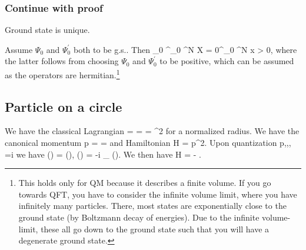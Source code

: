 \subsubsection{Continue with proof}
\begin{mybox}{}
	Ground state is unique.
\end{mybox}
Assume $\Psi_0$ and $\Psi^\prime_0$ both to be g.s.. Then
\bse 
\int \Psi_0 \Psi^\prime_0 \md^N X = 0\quad \int \Psi \Psi^\prime_0 \md^N x > 0,
\ese 
where the latter follows from choosing $\Psi_0$ and $\Psi^\prime_0$ to be positive, which can be assumed as the operators are hermitian.\footnote{This holds only for QM because it describes a finite volume. If you go towards QFT, you have to consider the infinite volume limit, where you have infinitely many particles. There, most states are exponentially close to the ground state (by Boltzmann decay of energies). Due to the infinite volume-limit, these all go down to the ground state such that you will have a degenerate ground state.}
\subsection{Particle on a circle} 
We have the classical Lagrangian 
\bse 
\mL =  =  = \half \dot{\phi}^2
\ese 
for a normalized radius. We have the canonical momentum 
\bse 
p = \frac{\partial \mL}{\partial \dot{\phi}}= \dot{\phi}
\ese 
and Hamiltonian
\bse 
H = \half p^2.
\ese 
Upon quantization 
\bse 
p,\phi \rightarrow {},\hat{\phi}, =i
\ese 
we have
\bse 
\hat{\phi} \psi(\phi) = \phi \psi(\phi), \quad {} \psi(\phi) = -i \partial_{\phi} \psi(\phi).
\ese 
We then have
\bse 
H = - \half {}.
\ese 
